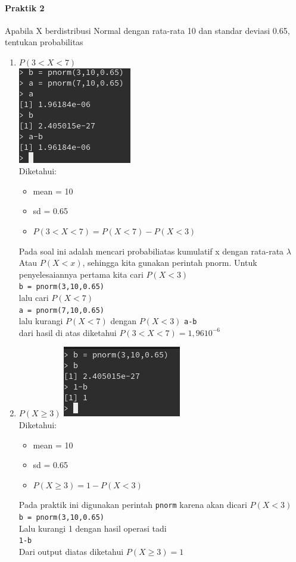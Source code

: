 \documentclass[a4paper,12pt]{article}
\begin{document}
\begin{enumerate}[label=\textbf{\Alph*.}]
\paragraph{Praktik 2\\}
Apabila X berdistribusi Normal dengan rata-rata 10 dan standar deviasi 0.65, tentukan probabilitas 
\begin{enumerate}
	\item $P(3 < X < 7)$\\
	\includegraphics{praka2a}\\
	Diketahui:
	\begin{itemize}
		\item mean = 10
		\item sd = 0.65 
		\item $P(3 < X < 7) = P(X < 7) - P(X < 3)$ 
	\end{itemize}
	Pada soal ini adalah mencari probabiliatas kumulatif x  dengan rata-rata $\lambda$
	Atau $P(X < x)$, sehingga kita gunakan perintah pnorm.
	Untuk penyelesaiannya pertama kita cari $P(X < 3)$\\
	\texttt{b = pnorm(3,10,0.65)}\\
	lalu cari $P(X < 7)$\\
	\texttt{a = pnorm(7,10,0.65)}\\
	lalu kurangi $P(X < 7)$ dengan $P(X < 3)$
	\texttt{a-b}\\
	dari hasil di atas diketahui $P(3 < X < 7) = 1,9610^{-6}$

    \item $P(X \geq 3)$
        \includegraphics{praka2b}\\
        Diketahui:
        \begin{itemize}
            \item mean = 10
            \item sd = 0.65 
            \item $P(X \geq 3) = 1 - P(X < 3)$ 
        \end{itemize} 
        Pada praktik ini digunakan perintah \texttt{pnorm} karena akan dicari $P(X < 3)$\\
        \texttt{b = pnorm(3,10,0.65)}\\
        Lalu kurangi 1 dengan hasil operasi tadi\\
        \texttt{1-b}\\
        Dari output diatas diketahui $P(X \geq 3) = 1$ 
	

\end{enumerate}
\end{enumerate}
\end{document}
